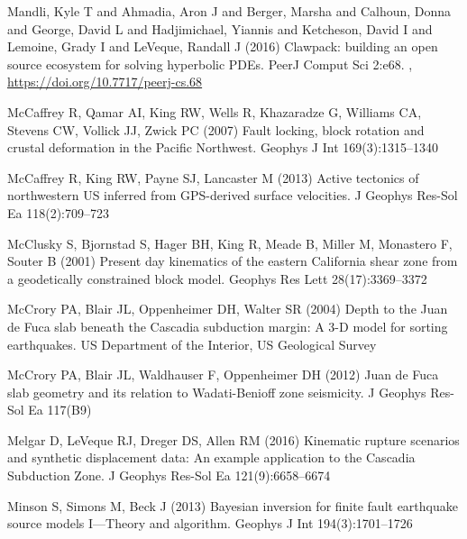 {\begin{thebibliography}{33}
Mandli, Kyle T and Ahmadia, Aron J and Berger, Marsha and Calhoun, Donna and George, David L and Hadjimichael, Yiannis and Ketcheson, David I and Lemoine, Grady I and LeVeque, Randall J (2016) Clawpack: building an open source ecosystem for solving hyperbolic {PDE}s. PeerJ Comput Sci 2:e68. , \urlprefix\url{https://doi.org/10.7717/peerj-cs.68}

McCaffrey R, Qamar AI, King RW, Wells R, Khazaradze G, Williams CA, Stevens CW,
  Vollick JJ, Zwick PC (2007) Fault locking, block rotation and crustal
  deformation in the {P}acific {N}orthwest. Geophys J Int 169(3):1315--1340

McCaffrey R, King RW, Payne SJ, Lancaster M (2013) Active tectonics of
  northwestern {US} inferred from {GPS}-derived surface velocities. J Geophys
  Res-Sol Ea 118(2):709--723

McClusky S, Bjornstad S, Hager BH, King R, Meade B, Miller M, Monastero F,
  Souter B (2001) Present day kinematics of the eastern {C}alifornia shear zone
  from a geodetically constrained block model. Geophys Res Lett
  28(17):3369--3372

McCrory PA, Blair JL, Oppenheimer DH, Walter SR (2004) Depth to the {J}uan de
  {F}uca slab beneath the {C}ascadia subduction margin: A 3-{D} model for
  sorting earthquakes. {US} Department of the Interior, {US} Geological Survey

McCrory PA, Blair JL, Waldhauser F, Oppenheimer DH (2012) Juan de {F}uca slab
  geometry and its relation to {W}adati-{B}enioff zone seismicity. J Geophys
  Res-Sol Ea 117(B9)

Melgar D, LeVeque RJ, Dreger DS, Allen RM (2016) Kinematic rupture scenarios
  and synthetic displacement data: An example application to the {C}ascadia
  {S}ubduction {Z}one. J Geophys Res-Sol Ea 121(9):6658--6674

Minson S, Simons M, Beck J (2013) Bayesian inversion for finite fault
  earthquake source models {I}---{T}heory and algorithm. Geophys J Int
  194(3):1701--1726


\end{thebibliography}}
